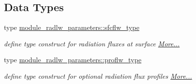 \subsection*{Data Types}
\begin{DoxyCompactItemize}
\item 
type \hyperlink{group__module__radlw__main_structmodule__radlw__parameters_1_1sfcflw__type}{module\+\_\+radlw\+\_\+parameters\+::sfcflw\+\_\+type}
\begin{DoxyCompactList}\small\item\em define type construct for radiation fluxes at surface  \hyperlink{group__module__radlw__main_structmodule__radlw__parameters_1_1sfcflw__type}{More...}\end{DoxyCompactList}\item 
type \hyperlink{group__module__radlw__main_structmodule__radlw__parameters_1_1proflw__type}{module\+\_\+radlw\+\_\+parameters\+::proflw\+\_\+type}
\begin{DoxyCompactList}\small\item\em define type construct for optional radiation flux profiles  \hyperlink{group__module__radlw__main_structmodule__radlw__parameters_1_1proflw__type}{More...}\end{DoxyCompactList}\end{DoxyCompactItemize}
